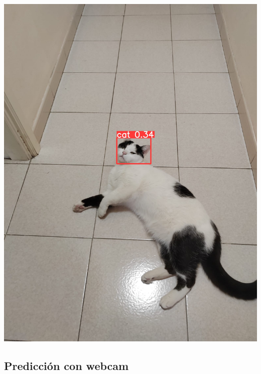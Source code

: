 \documentclass[11pt]{article}
\begin{document}
\begin{longtable}[]
\includegraphics{predicts/predict 3.jpg} \\
\end{longtable}

    \subsection{Predicción con webcam}\label{predicciuxf3n-con-webcam}
\end{document}
